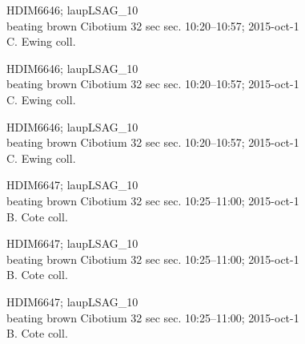 \documentclass[2pt]{extarticle}
\begin{document}
\noindent
\parbox{0.16\textwidth}{\tiny \raggedright \rule[-0.3\baselineskip]{0pt}{10pt}HDIM6646; laupLSAG\_10\\ beating brown Cibotium 32 sec sec. 10:20--10:57; 2015-oct-1\\ C. Ewing coll.}
\parbox{0.16\textwidth}{\tiny \raggedright \rule[-0.3\baselineskip]{0pt}{10pt}HDIM6646; laupLSAG\_10\\ beating brown Cibotium 32 sec sec. 10:20--10:57; 2015-oct-1\\ C. Ewing coll.}
\parbox{0.16\textwidth}{\tiny \raggedright \rule[-0.3\baselineskip]{0pt}{10pt}HDIM6646; laupLSAG\_10\\ beating brown Cibotium 32 sec sec. 10:20--10:57; 2015-oct-1\\ C. Ewing coll.}
\parbox{0.16\textwidth}{\tiny \raggedright \rule[-0.3\baselineskip]{0pt}{10pt}HDIM6647; laupLSAG\_10\\ beating brown Cibotium 32 sec sec. 10:25--11:00; 2015-oct-1\\ B. Cote coll.}
\parbox{0.16\textwidth}{\tiny \raggedright \rule[-0.3\baselineskip]{0pt}{10pt}HDIM6647; laupLSAG\_10\\ beating brown Cibotium 32 sec sec. 10:25--11:00; 2015-oct-1\\ B. Cote coll.}
\parbox{0.16\textwidth}{\tiny \raggedright \rule[-0.3\baselineskip]{0pt}{10pt}HDIM6647; laupLSAG\_10\\ beating brown Cibotium 32 sec sec. 10:25--11:00; 2015-oct-1\\ B. Cote coll.} \\ 
\vspace{0.001in} 
\end{document}
